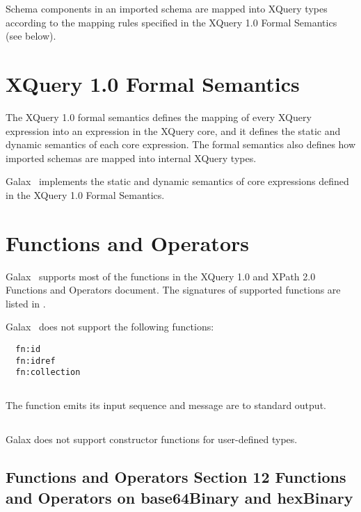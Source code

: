       Schema components in an imported schema are mapped into XQuery 
      types according to the mapping rules specified in the XQuery 1.0
      Formal Semantics (see below).

\section{XQuery 1.0 Formal Semantics}

  The XQuery 1.0 formal semantics defines the mapping of every XQuery
  expression into an expression in the XQuery core, and it defines the
  static and dynamic semantics of each core expression.  The formal
  semantics also defines how imported schemas are mapped into internal
  XQuery types.
  
  Galax \version\ implements the static and dynamic semantics of core
  expressions defined in the XQuery 1.0 Formal Semantics. 

\section{Functions and Operators}

  Galax \version\ supports most of the functions in the XQuery 1.0 and
  XPath 2.0 Functions and Operators document.  The signatures of
  supported functions are listed in .

  Galax \version\ does not support the following functions: 
\begin{verbatim}
  fn:id
  fn:idref
  fn:collection
\end{verbatim}

\subsection*{}

    The  function emits its input sequence and message are to standard output. 

\subsection*{}
Galax \version does not support constructor functions for user-defined
types. 

\subsection*{Functions and Operators Section 12 Functions and Operators on base64Binary and hexBinary}

